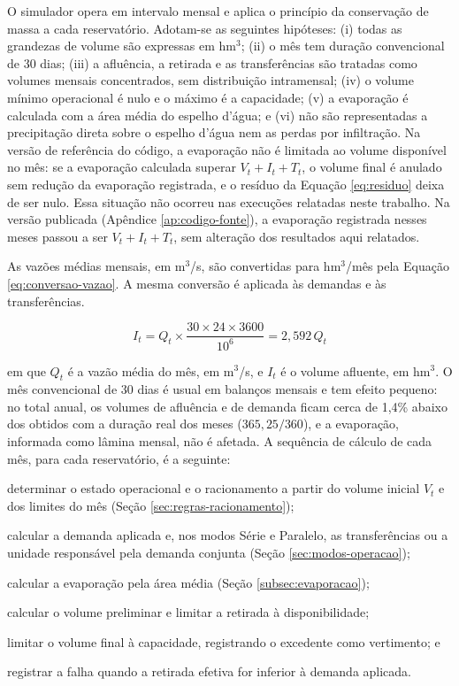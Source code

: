 O simulador opera em intervalo mensal e aplica o princípio da conservação de massa a cada reservatório. Adotam-se as seguintes hipóteses: (i) todas as grandezas de volume são expressas em hm$^3$; (ii) o mês tem duração convencional de 30 dias; (iii) a afluência, a retirada e as transferências são tratadas como volumes mensais concentrados, sem distribuição intramensal; (iv) o volume mínimo operacional é nulo e o máximo é a capacidade; (v) a evaporação é calculada com a área média do espelho d'água; e (vi) não são representadas a precipitação direta sobre o espelho d'água nem as perdas por infiltração. Na versão de referência do código, a evaporação não é limitada ao volume disponível no mês: se a evaporação calculada superar $V_t + I_t + T_t$, o volume final é anulado sem redução da evaporação registrada, e o resíduo da Equação \ref{eq:residuo} deixa de ser nulo. Essa situação não ocorreu nas execuções relatadas neste trabalho. Na versão publicada (Apêndice \ref{ap:codigo-fonte}), a evaporação registrada nesses meses passou a ser $V_t + I_t + T_t$, sem alteração dos resultados aqui relatados.

As vazões médias mensais, em m$^3$/s, são convertidas para hm$^3$/mês pela Equação \ref{eq:conversao-vazao}. A mesma conversão é aplicada às demandas e às transferências.

\begin{equation}
    I_t = Q_t \times \frac{30 \times 24 \times 3600}{10^6}
        = 2{,}592\,Q_t
    \label{eq:conversao-vazao}
\end{equation}

em que $Q_t$ é a vazão média do mês, em m$^3$/s, e $I_t$ é o volume afluente, em hm$^3$. O mês convencional de 30 dias é usual em balanços mensais e tem efeito pequeno: no total anual, os volumes de afluência e de demanda ficam cerca de 1,4\% abaixo dos obtidos com a duração real dos meses ($365{,}25/360$), e a evaporação, informada como lâmina mensal, não é afetada. A sequência de cálculo de cada mês, para cada reservatório, é a seguinte:

\begin{alineas}
    \item determinar o estado operacional e o racionamento a partir do volume inicial $V_t$ e dos limites do mês (Seção \ref{sec:regras-racionamento});
    \item calcular a demanda aplicada e, nos modos Série e Paralelo, as transferências ou a unidade responsável pela demanda conjunta (Seção \ref{sec:modos-operacao});
    \item calcular a evaporação pela área média (Seção \ref{subsec:evaporacao});
    \item calcular o volume preliminar e limitar a retirada à disponibilidade;
    \item limitar o volume final à capacidade, registrando o excedente como vertimento; e
    \item registrar a falha quando a retirada efetiva for inferior à demanda aplicada.
\end{alineas}

